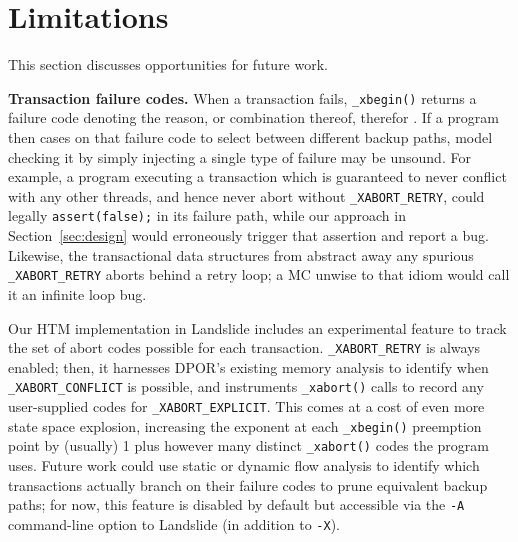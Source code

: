 \documentclass[10pt]{sigplanconf}
\begin{document}

\section{Limitations}
\label{sec:warpzone}

This section discusses opportunities for future work.

{\bf Transaction failure codes.}
When a transaction fails, {\tt \_xbegin()} returns a failure code
denoting the reason, or combination thereof, therefor \cite{htm-gcc}.
If a program then cases on that failure code to select between different backup paths,
model checking it by simply injecting a single type of failure may be unsound.
For example, a program executing a transaction which is guaranteed to never conflict with any other threads,
and hence never abort without {\tt \_XABORT\_RETRY},
could legally {\tt assert(false);} in its failure path,
while our approach in Section~\ref{sec:design} would erroneously trigger that assertion and report a bug.
Likewise, the transactional data structures from \cite{htm-mario}
abstract away any spurious {\tt \_XABORT\_RETRY} aborts behind a retry loop;
a MC unwise to that idiom would call it an infinite loop bug.

Our HTM implementation in Landslide includes an experimental feature
to track the set of abort codes possible for each transaction.
{\tt \_XABORT\_RETRY} is always enabled;
then,
it harnesses DPOR's existing memory analysis to identify when {\tt \_XABORT\_CONFLICT} is possible,
and instruments {\tt \_xabort()} calls to record any user-supplied codes for {\tt \_XABORT\_EXPLICIT}.
This comes at a cost of even more state space explosion,
increasing the exponent at each {\tt \_xbegin()} preemption point
by (usually) 1 plus however many distinct {\tt \_xabort()} codes the program uses.
Future work could use static or dynamic flow analysis to
identify which transactions actually branch on their failure codes
to prune equivalent backup paths;
for now, this feature is disabled by default but accessible via the {\tt -A} command-line option
to Landslide (in addition to {\tt -X}).
\end{document}
